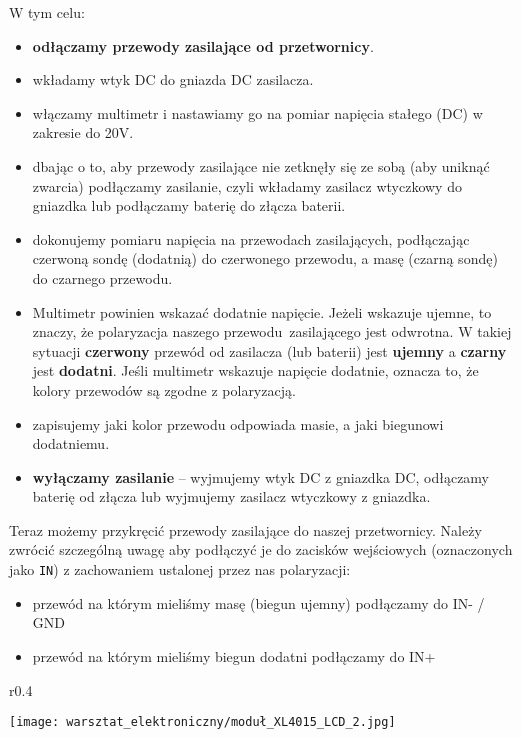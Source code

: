 \documentclass{pdfBooklets}
\begin{document}
\noindent W tym celu:
\begin{itemize}
	\item \textbf{odłączamy przewody zasilające od przetwornicy}.
	\item wkładamy wtyk DC do gniazda DC zasilacza.
	\item włączamy multimetr i nastawiamy go na pomiar napięcia stałego (DC) w zakresie do 20V.
	\item dbając o to, aby przewody zasilające nie zetknęły się ze sobą (aby uniknąć zwarcia) podłączamy zasilanie, czyli wkładamy zasilacz wtyczkowy do gniazdka lub podłączamy baterię do złącza baterii.
	\item dokonujemy pomiaru napięcia na przewodach zasilających, podłączając czerwoną sondę (dodatnią) do czerwonego przewodu, a masę (czarną sondę) do czarnego przewodu.
        \item Multimetr powinien wskazać dodatnie napięcie. Jeżeli wskazuje ujemne, to znaczy, że polaryzacja naszego przewodu~zasilającego jest odwrotna. W takiej sytuacji \textbf{czerwony} przewód od zasilacza (lub baterii) jest \textbf{ujemny} a \textbf{czarny} jest \textbf{dodatni}. Jeśli multimetr wskazuje napięcie dodatnie, oznacza to, że kolory przewodów są zgodne z polaryzacją. 
	\item zapisujemy jaki kolor przewodu odpowiada masie, a jaki biegunowi dodatniemu.
	\item \textbf{wyłączamy zasilanie} – wyjmujemy wtyk DC z gniazdka DC, odłączamy baterię od złącza lub wyjmujemy zasilacz wtyczkowy z gniazdka.
\end{itemize}
Teraz możemy przykręcić przewody zasilające do naszej przetwornicy. Należy zwrócić szczególną uwagę aby podłączyć je do zacisków wejściowych (oznaczonych jako \texttt{IN}) z zachowaniem ustalonej przez nas polaryzacji:
\begin{itemize}
	\item przewód na którym mieliśmy masę (biegun ujemny) podłączamy do IN- / GND
	\item przewód na którym mieliśmy biegun dodatni podłączamy do IN+
\end{itemize}

\begin{wrapfigure}{r}{0.4\textwidth}
  \begin{center}
    \vspace{-30pt}
    \texttt{[image: warsztat\_elektroniczny/moduł\_XL4015\_LCD\_2.jpg]}
    \vspace{-50pt}
  \end{center}
\end{wrapfigure}
\end{document}

